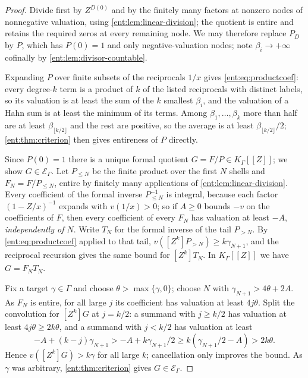 \documentclass[11pt]{article}
\theoremstyle{plain}
\theoremstyle{plain}
\theoremstyle{plain}
\theoremstyle{definition}
\theoremstyle{definition}
\theoremstyle{definition}
\theoremstyle{definition}
\theoremstyle{remark}
\newcommand{\K}{K_\Gamma}\newcommand{\KD}{K_\Delta}
\newcommand{\E}{\mathcal E_\Gamma}
\begin{document}
\begin{proof}
Divide first by $Z^{D(0)}$ and by the finitely many factors at nonzero nodes
of nonnegative valuation, using \cref{ent:lem:linear-division}; the quotient
is entire and retains the required zeros at every remaining node. We may
therefore replace $P_D$ by $P$, which has $P(0)=1$ and only negative-valuation
nodes; note $\beta_i\to+\infty$ cofinally by
\cref{ent:lem:divisor-countable}.

Expanding $P$ over finite subsets of the reciprocals $1/x$ gives
\eqref{ent:eq:productcoef}: every degree-$k$ term is a product of $k$ of the
listed reciprocals with distinct labels, so its valuation is at least the sum
of the $k$ smallest $\beta_i$, and the valuation of a Hahn sum is at least the
minimum of its terms. Among $\beta_1,\ldots,\beta_k$ more than half are at
least $\beta_{\lfloor k/2\rfloor}$ and the rest are positive, so the average
is at least $\beta_{\lfloor k/2\rfloor}/2$;
\cref{ent:thm:criterion} then gives entireness of $P$ directly.

Since $P(0)=1$ there is a unique formal quotient $G=F/P\in\K[[Z]]$; we show
$G\in\E$. Let $P_{\le N}$ be the finite product over the first $N$ shells and
$F_N=F/P_{\le N}$, entire by finitely many applications of
\cref{ent:lem:linear-division}. Every coefficient of the formal inverse
$P_{\le N}^{-1}$ is integral, because each factor $(1-Z/x)^{-1}$ expands with
$v(1/x)>0$; so if $A\ge0$ bounds $-v$ on the coefficients of $F$, then every
coefficient of every $F_N$ has valuation at least $-A$, \emph{independently of
$N$}. Write $T_N$ for the formal inverse of the tail $P_{>N}$. By
\eqref{ent:eq:productcoef} applied to that tail, $v([Z^k]P_{>N})\ge
k\gamma_{N+1}$, and the reciprocal recursion gives the same bound for
$[Z^k]T_N$. In $\K[[Z]]$ we have $G=F_NT_N$.

Fix a target $\gamma\in\Gamma$ and choose $\theta>\max\{\gamma,0\}$; choose
$N$ with $\gamma_{N+1}>4\theta+2A$. As $F_N$ is entire, for all large $j$ its
coefficient has valuation at least $4j\theta$. Split the convolution for
$[Z^k]G$ at $j=k/2$: a summand with $j\ge k/2$ has valuation at least
$4j\theta\ge2k\theta$, and a summand with $j<k/2$ has valuation at least
\[
 -A+(k-j)\gamma_{N+1}>-A+k\gamma_{N+1}/2
 \ge k(\gamma_{N+1}/2-A)>2k\theta .
\]
Hence $v([Z^k]G)>k\gamma$ for all large $k$; cancellation only improves the
bound. As $\gamma$ was arbitrary, \cref{ent:thm:criterion} gives $G\in\E$.
\end{proof}
\end{document}
